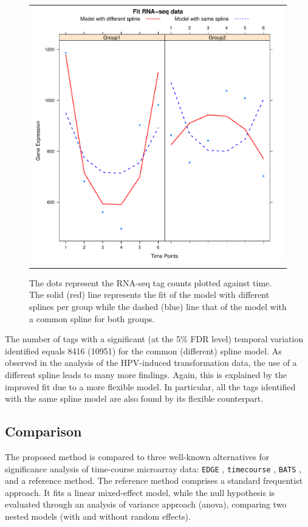 \begin{figure}[h!]
\centering
\begin{tabular}{c}
\includegraphics[scale=0.55]{Figure8.pdf} %
\end{tabular}
\caption{The dots represent the RNA-seq tag counts plotted against time. The
 solid (red) line represents the fit of the model with different splines per group
 while the dashed (blue) line that of the model with a common spline for both
 groups.}
\label{seqdata}
\end{figure}

The number of tags with a significant (at the 5\% FDR level) temporal variation identified equals 8416 (10951) for the common (different) spline model. As observed in the analysis of the HPV-induced transformation data, the use of a different spline leads to many more findings. Again, this is explained by the improved fit due to a more flexible model. In particular, all the tags identified with the same spline model are also found by its flexible counterpart.


\subsection{Comparison}
\label{comparison}
The proposed method is compared to three well-known alternatives for significance analysis of time-course microarray data: {\tt EDGE} \cite{Storey2005}, {\tt timecourse} \cite{Tai2006}, {\tt BATS} \cite{Angelini2007, Mutarelli2008}, and a reference method. The reference method comprises a standard frequentist approach. It fits a linear mixed-effect model, while the null hypothesis is evaluated through an analysis of variance approach (anova), comparing two nested models (with and without random effects).

